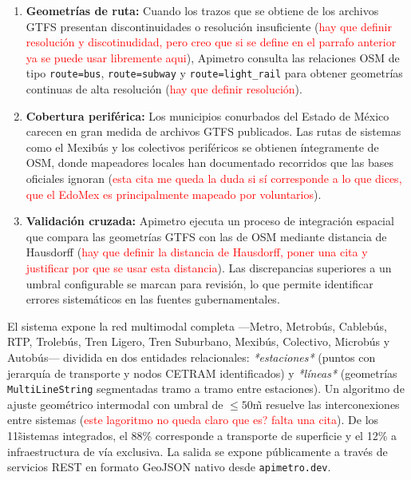 \documentclass{isprs} %
\begin{document}
\begin{enumerate}[nosep, leftmargin=1.5em]
\item \textbf{Geometrías de ruta:}  Cuando los trazos que se obtiene de los archivos GTFS presentan discontinuidades o resolución insuficiente (\textcolor{red}{hay que definir resolución y discotinudidad, pero creo que si se define en el parrafo anterior ya se puede usar libremente aqui}), Apimetro consulta las relaciones OSM de tipo \texttt{route=bus}, \texttt{route=subway} y \texttt{route=light\_rail} para obtener geometrías continuas de alta resolución (\textcolor{red}{hay que definir resolución}).
\item \textbf{Cobertura periférica:}  Los municipios conurbados del Estado de México carecen en gran medida de archivos GTFS publicados.  Las rutas de sistemas como el Mexibús y los colectivos periféricos se obtienen íntegramente de OSM, donde mapeadores locales han documentado recorridos que las bases oficiales ignoran \citep{haklay2010good} (\textcolor{red}{esta cita me queda la duda si sí corresponde a lo que dices, que el EdoMex es principalmente mapeado por voluntarios}).
\item \textbf{Validación cruzada:}  Apimetro ejecuta un proceso de integración espacial que compara las geometrías GTFS con las de OSM mediante distancia de Hausdorff (\textcolor{red}{hay que definir la distancia de Hausdorff, poner una cita y justificar por que se usar esta distancia}).  Las discrepancias superiores a un umbral configurable se marcan para revisión, lo que permite identificar errores sistemáticos en las fuentes gubernamentales.
\end{enumerate}

El sistema expone la red multimodal completa ---Metro, Metrobús, Cablebús, RTP, Trolebús, Tren Ligero, Tren Suburbano, Mexibús, Colectivo, Microbús y Autobús--- dividida en dos entidades relacionales: \textit{*estaciones*} (puntos con jerarquía de transporte y nodos CETRAM identificados) y \textit{*líneas*} (geometrías \texttt{MultiLineString} segmentadas tramo a tramo entre estaciones).  Un algoritmo de ajuste geométrico intermodal con umbral de $\leq 50$\~m resuelve las interconexiones entre sistemas (\textcolor{red}{este lagoritmo no queda claro que es? falta una cita}).  De los 11\~sistemas integrados, el 88\% corresponde a transporte de superficie y el 12\% a infraestructura de vía exclusiva.  La salida se expone públicamente a través de servicios REST en formato GeoJSON nativo desde \texttt{apimetro.dev}.
\end{document}
